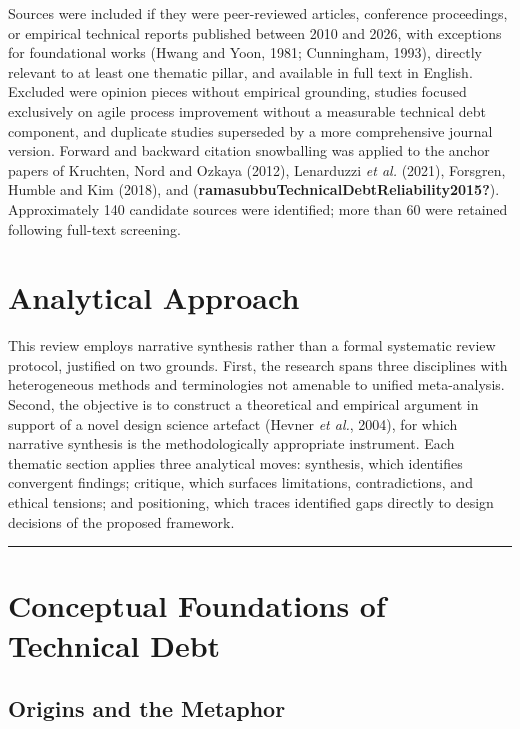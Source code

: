\documentclass[
  british,
  12pt,
  a4paper,
]{report}
\begin{document}
Sources were included if they were peer-reviewed articles, conference
proceedings, or empirical technical reports published between 2010 and
2026, with exceptions for foundational works (Hwang and Yoon, 1981;
Cunningham, 1993), directly relevant to at least one thematic pillar,
and available in full text in English. Excluded were opinion pieces
without empirical grounding, studies focused exclusively on agile
process improvement without a measurable technical debt component, and
duplicate studies superseded by a more comprehensive journal version.
Forward and backward citation snowballing was applied to the anchor
papers of Kruchten, Nord and Ozkaya (2012), Lenarduzzi \emph{et al.}
(2021), Forsgren, Humble and Kim (2018), and
(\textbf{ramasubbuTechnicalDebtReliability2015?}). Approximately 140
candidate sources were identified; more than 60 were retained following
full-text screening.

\section{Analytical Approach}\label{analytical-approach}

This review employs narrative synthesis rather than a formal systematic
review protocol, justified on two grounds. First, the research spans
three disciplines with heterogeneous methods and terminologies not
amenable to unified meta-analysis. Second, the objective is to construct
a theoretical and empirical argument in support of a novel design
science artefact (Hevner \emph{et al.}, 2004), for which narrative
synthesis is the methodologically appropriate instrument. Each thematic
section applies three analytical moves: synthesis, which identifies
convergent findings; critique, which surfaces limitations,
contradictions, and ethical tensions; and positioning, which traces
identified gaps directly to design decisions of the proposed framework.

\begin{center}\rule{0.5\linewidth}{0.5pt}\end{center}

\section{Conceptual Foundations of Technical
Debt}\label{conceptual-foundations-of-technical-debt}

\subsection{Origins and the Metaphor}\label{origins-and-the-metaphor}
\end{document}

